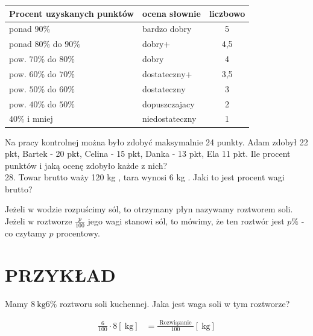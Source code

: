 \documentclass[10pt]{article}
\begin{document}
\begin{center}
\begin{tabular}{l|l|c}
Procent uzyskanych punktów & ocena słownie & liczbowo \\
\hline
ponad \(90 \%\) & bardzo dobry & 5 \\
ponad \(80 \%\) do \(90 \%\) & dobry+ & 4,5 \\
pow. \(70 \%\) do \(80 \%\) & dobry & 4 \\
pow. \(60 \%\) do \(70 \%\) & dostateczny+ & 3,5 \\
pow. \(50 \%\) do \(60 \%\) & dostateczny & 3 \\
pow. \(40 \%\) do \(50 \%\) & dopuszczajacy & 2 \\
\(40 \%\) i mniej & niedostateczny & 1 \\
\end{tabular}
\end{center}

Na pracy kontrolnej można było zdobyć maksymalnie 24 punkty. Adam zdobył 22 pkt, Bartek - 20 pkt, Celina - 15 pkt, Danka - 13 pkt, Ela 11 pkt. Ile procent punktów i jaką ocenę zdobyło każde z nich?\\
28. Towar brutto waży 120 kg , tara wynosi 6 kg . Jaki to jest procent wagi brutto?

Jeżeli w wodzie rozpuścimy sól, to otrzymany płyn nazywamy roztworem soli. Jeżeli w roztworze \(\frac{p}{100}\) jego wagi stanowi sól, to mówimy, że ten roztwór jest \(p \%\) - co czytamy \(p\) procentowy.

\section*{PRZYKŁAD}
Mamy \(8 \mathrm{~kg} 6 \%\) roztworu soli kuchennej. Jaka jest waga soli w tym roztworze?

\[
\begin{aligned}
\frac{6}{100} \cdot 8[\mathrm{~kg}] & =\frac{\text { Rozwiązanie }}{100}[\mathrm{~kg}]
\end{aligned}
\]
\end{document}
